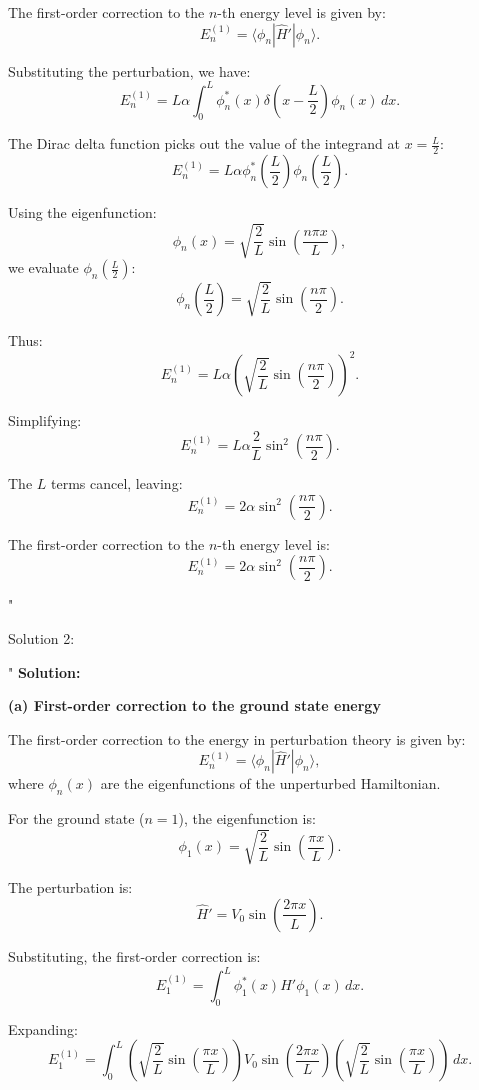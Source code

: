 The first-order correction to the \(n\)-th energy level is given by:
\[
E_n^{(1)} = \langle \phi_n | \hat{H}' | \phi_n \rangle.
\]

Substituting the perturbation, we have:
\[
E_n^{(1)} = L \alpha \int_0^L \phi_n^*(x) \delta\left(x - \frac{L}{2}\right) \phi_n(x) \, dx.
\]

The Dirac delta function picks out the value of the integrand at \(x = \frac{L}{2}\):
\[
E_n^{(1)} = L \alpha \phi_n^*\left(\frac{L}{2}\right) \phi_n\left(\frac{L}{2}\right).
\]

Using the eigenfunction:
\[
\phi_n(x) = \sqrt{\frac{2}{L}} \sin\left(\frac{n \pi x}{L}\right),
\]
we evaluate \(\phi_n\left(\frac{L}{2}\right)\):
\[
\phi_n\left(\frac{L}{2}\right) = \sqrt{\frac{2}{L}} \sin\left(\frac{n \pi}{2}\right).
\]

Thus:
\[
E_n^{(1)} = L \alpha \left(\sqrt{\frac{2}{L}} \sin\left(\frac{n \pi}{2}\right)\right)^2.
\]

Simplifying:
\[
E_n^{(1)} = L \alpha \frac{2}{L} \sin^2\left(\frac{n \pi}{2}\right).
\]

The \(L\) terms cancel, leaving:
\[
E_n^{(1)} = 2 \alpha \sin^2\left(\frac{n \pi}{2}\right).
\]

The first-order correction to the \(n\)-th energy level is:
\[
\boxed{E_n^{(1)} = 2 \alpha \sin^2\left(\frac{n \pi}{2}\right).}
\]

"

Solution 2: 

"
\textbf{Solution:}

\textbf{(a) First-order correction to the ground state energy}

The first-order correction to the energy in perturbation theory is given by:
\[
E_n^{(1)} = \langle \phi_n | \hat{H}' | \phi_n \rangle,
\]
where \(\phi_n(x)\) are the eigenfunctions of the unperturbed Hamiltonian.

For the ground state (\(n = 1\)), the eigenfunction is:
\[
\phi_1(x) = \sqrt{\frac{2}{L}} \sin\left(\frac{\pi x}{L}\right).
\]

The perturbation is:
\[
\hat{H}' = V_0 \sin\left(\frac{2\pi x}{L}\right).
\]

Substituting, the first-order correction is:
\[
E_1^{(1)} = \int_0^L \phi_1^*(x) \hat{H}' \phi_1(x) \, dx.
\]

Expanding:
\[
E_1^{(1)} = \int_0^L \left(\sqrt{\frac{2}{L}} \sin\left(\frac{\pi x}{L}\right)\right) V_0 \sin\left(\frac{2\pi x}{L}\right) \left(\sqrt{\frac{2}{L}} \sin\left(\frac{\pi x}{L}\right)\right) \, dx.
\]

